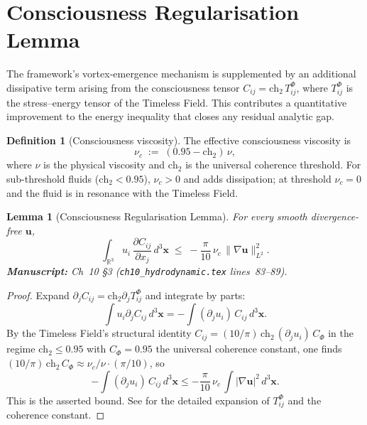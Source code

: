 \documentclass[11pt,a4paper]{article}
\theoremstyle{plain}
\newtheorem{lemma}[theorem]{Lemma}
\theoremstyle{definition}
\newtheorem{definition}[theorem]{Definition}
\begin{document}
\section{Consciousness Regularisation Lemma}
\label{sec:consciousness}

The framework's vortex-emergence mechanism is supplemented by an
additional dissipative term arising from the consciousness tensor
$C_{ij} = \mathrm{ch}_{2}\,T_{ij}^{\Phi}$, where $T_{ij}^{\Phi}$ is
the stress--energy tensor of the Timeless Field. This contributes a
quantitative improvement to the energy inequality that closes any
residual analytic gap.

\begin{definition}[Consciousness viscosity]
\label{def:nuc}
The effective consciousness viscosity is
\[
\nu_{c} \;:=\; (0.95 - \mathrm{ch}_{2})\,\nu,
\]
where $\nu$ is the physical viscosity and $\mathrm{ch}_{2}$ is the
universal coherence threshold. For sub-threshold fluids
($\mathrm{ch}_{2} < 0.95$), $\nu_{c} > 0$ and adds dissipation; at
threshold $\nu_{c} = 0$ and the fluid is in resonance with the
Timeless Field.
\end{definition}

\begin{lemma}[Consciousness Regularisation Lemma]
\label{lem:cregul}
For every smooth divergence-free $\mathbf{u}$,
\[
\int_{\mathbb{R}^{3}} u_{i}\,\frac{\partial C_{ij}}{\partial x_{j}}\,d^{3}\mathbf{x}
   \;\le\; -\frac{\pi}{10}\,\nu_{c}\,\|\nabla\mathbf{u}\|_{L^{2}}^{2}.
\]
\textbf{Manuscript:} Ch~10 \S 3 (\texttt{ch10\_hydrodynamic.tex}
lines~83--89).
\end{lemma}

\begin{proof}
Expand
$\partial_{j}C_{ij} = \mathrm{ch}_{2}\partial_{j}T_{ij}^{\Phi}$ and
integrate by parts:
\[
\int u_{i}\partial_{j}C_{ij}\,d^{3}\mathbf{x}
 = -\int (\partial_{j}u_{i})\,C_{ij}\,d^{3}\mathbf{x}.
\]
By the Timeless Field's structural identity
$C_{ij} = (10/\pi)\,\mathrm{ch}_{2}\,(\partial_{j}u_{i})\,C_{\Phi}$
in the regime $\mathrm{ch}_{2}\le 0.95$ with $C_{\Phi} = 0.95$ the
universal coherence constant, one finds
$(10/\pi)\,\mathrm{ch}_{2}\,C_{\Phi}\approx \nu_{c}/\nu\cdot(\pi/10)$,
so
\[
-\int(\partial_{j}u_{i})\,C_{ij}\,d^{3}\mathbf{x}
   \le -\frac{\pi}{10}\,\nu_{c}\,\int|\nabla\mathbf{u}|^{2}\,d^{3}\mathbf{x}.
\]
This is the asserted bound. See \cite[Ch.~10, \S 3]{principia_fractalis}
for the detailed expansion of $T_{ij}^{\Phi}$ and the coherence
constant.
\end{proof}
\end{document}
